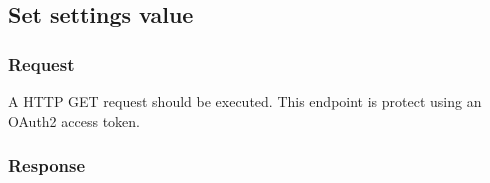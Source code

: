 \subsection{Set settings value}
\label{subsec:set-settings-value}

\subsubsection{Request}

A HTTP GET request should be executed.
This endpoint is protect using an OAuth2 access token.




\subsubsection{Response}



